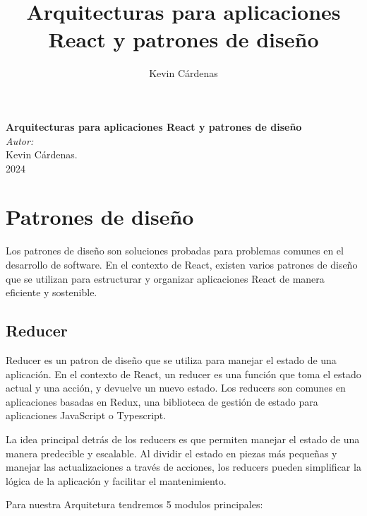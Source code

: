 \documentclass[executivepaper]{article}
\title{Arquitecturas para aplicaciones React y patrones de diseño}
\author{Kevin Cárdenas}
\begin{document}
\begin{titlepage}
    \begin{center}
        {\Huge \textbf{Arquitecturas para aplicaciones React y patrones de diseño}}
        \\[17cm]

        \large\emph{Autor:}\\
        Kevin Cárdenas.
        \\[1cm]
        {\large 2024}
    \end{center}
\end{titlepage}

\newpage
\tableofcontents
\newpage

\section{Patrones de diseño}

Los patrones de diseño son soluciones probadas para problemas comunes en el desarrollo de software. En el contexto de React, existen varios patrones de diseño que se utilizan para estructurar y organizar aplicaciones React de manera eficiente y sostenible.

\subsection{Reducer}

Reducer es un patron de diseño que se utiliza para manejar el estado de una aplicación. En el contexto de React, un reducer es una función que toma el estado actual y una acción, y devuelve un nuevo estado. Los reducers son comunes en aplicaciones basadas en Redux, una biblioteca de gestión de estado para aplicaciones JavaScript o Typescript.

La idea principal detrás de los reducers es que permiten manejar el estado de una manera predecible y escalable. Al dividir el estado en piezas más pequeñas y manejar las actualizaciones a través de acciones, los reducers pueden simplificar la lógica de la aplicación y facilitar el mantenimiento.

Para nuestra Arquitetura tendremos 5 modulos principales:
\end{document}
